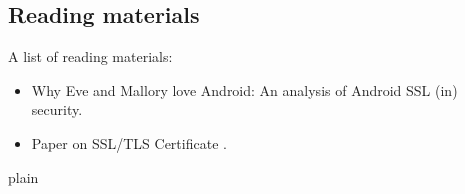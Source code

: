 \documentclass[a4paper, 12pt]{article}
\begin{document}
\subsection{Reading materials}
A list of reading materials: 
\begin{itemize}
\item Why Eve and Mallory love Android: An analysis of Android SSL (in) security. \cite{fahl2012eve}
\item Paper on SSL/TLS Certificate \cite{akhawe2013here}.
\end{itemize}


\clearpage
 {plain}

\end{document}
